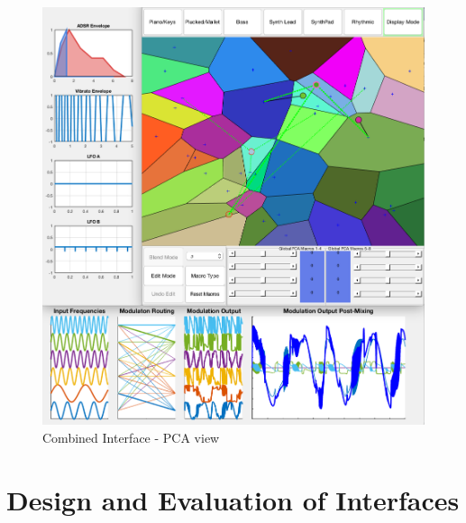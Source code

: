 \documentclass[11pt, oneside]{report}   	%
\begin{document}
\begin{figure}[h] 
	\centering
	\hspace*{-1.5cm}
	\includegraphics[width = 7.5in]{CombinedInterface1.png}
	\caption{Combined Interface - PCA view}
	\label{fig:CombinedInterface}
\end{figure}

\chapter{Design and Evaluation of Interfaces}
\end{document}
